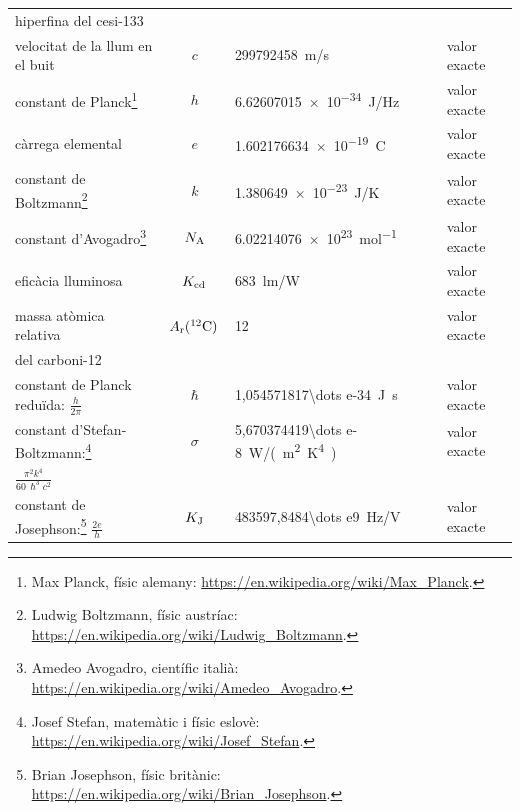 \begin{ThreePartTable}
\begin{longtable}{lcll}
	hiperfina del cesi-133 & & & \index{$\Delta\nu\ped{Cs}$}\\[1em]
	velocitat de la llum en el buit & $c$ & \qty{299 792 458}{m/s} & valor exacte \index{c@$c$}\\[1em]
	constant de Planck\footnote{Max  Planck, físic alemany: \href{https://en.wikipedia.org/wiki/Max_Planck}{https:/\!\!/en.wikipedia.org/wiki/Max\_Planck}.} & $h$ & \qty{6,62607015 e-34}{J/Hz} & valor exacte\index{constants!de Planck}\index{h@$h$}\\[1em]
	càrrega elemental & $e$ & \qty{1,602176634 e-19}{C} & valor exacte\index{carrega@càrrega!elemental}\index{e@$e$}\\[1em]
	constant de Boltzmann\footnote{Ludwig  Boltzmann, físic austríac: \href{https://en.wikipedia.org/wiki/Ludwig_Boltzmann}{https:/\!\!/en.wikipedia.org/wiki/Ludwig\_Boltzmann}.} & $k$ & \qty{1,380649e-23}{J/K} & valor exacte\index{constants!de Boltzmann}\index{k@$k$}\\[1em]
	constant d'Avogadro\tnote{\color{blue}(a)}\hspace{4mm}\footnote{Amedeo Avogadro, científic italià: \href{https://en.wikipedia.org/wiki/Amedeo_Avogadro}{https:/\!\!/en.wikipedia.org/wiki/Amedeo\_Avogadro}.} & $N\ped{A}$ & \qty{6,02214076 e23}{mol^{-1}} & valor exacte\index{constants!d'Avogadro}\index{NA@$N\ped{A}$}\\[1em]
	eficàcia lluminosa\tnote{\color{blue}(b)} & $K\ped{cd}$ & \qty{683}{lm/W} & valor exacte\index{eficàcia lluminosa}\index{Kcd@$K\ped{cd}$}\\[1em]
	massa atòmica relativa\tnote{\color{blue}(c)} & $A_\mathrm{r}({}^{12}\mathrm{C})\,$ & 12 & valor exacte\\
	del carboni-12 & & &\index{massa!atòmica relativa del carboni-12}\index{Ar@$A\ped{r}({}^{12}\mathrm{C})$}\\[1em]
	constant de Planck reduïda: $\frac{h}{2\pi}$ & $\hslash$ & \qty{1,054571817\dots e-34}{J.s} & valor exacte\index{constants!de Planck redu\"{i}da}\index{h@$\hslash$}\\[.8em]
	constant d'Stefan-Boltzmann:\footnote{Josef Stefan, matemàtic i físic eslovè: \href{https://en.wikipedia.org/wiki/Josef_Stefan}{https:/\!\!/en.wikipedia.org/wiki/Josef\_Stefan}.}  & $\sigma$ & \qty{5,670374419\dots e-8}{W/(m^2.K^4)} & valor exacte\index{constants!d'Stefan-Boltzmann}\index{$\sigma$}\\ 
	$\frac{\pi^2 k^4}{60\, \hslash^3 c^2}$ & & & \\[0.8em]
	constant de Josephson:\footnote{Brian Josephson, físic britànic: \href{https://en.wikipedia.org/wiki/Brian_Josephson}{https:/\!\!/en.wikipedia.org/wiki/Brian\_Josephson}.} $\frac{2 e}{h}$ & $K\ped{J}$ & \qty{483597,8484\dots e9}{Hz/V} & valor exacte\index{constants!de Josephson}\index{KJ@$K\ped{J}$}\\[0.9em]

\end{longtable}
\end{ThreePartTable}
